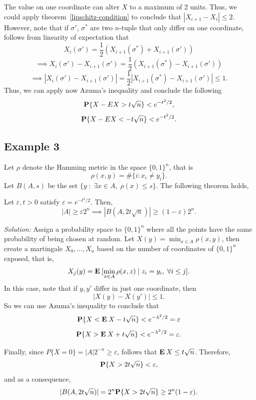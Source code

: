The value on one coordinate can alter $X$ to a maximum of 2 units. Thus, we could apply {theorem}~\ref{lipschitz-condition} to conclude that $|X_{i+1}- X_i| \leq 2$. However, note that if $\sigma'$, $\sigma^*$ are two $n$-tuple that only differ on one coordinate, follows from linearity of expectation that
\[ X_i(\sigma') = \frac{1}{2}(X_{i+1}(\sigma^*)+ X_{i+1}(\sigma')) \]
\[ \implies X_i(\sigma') - X_{i+1}(\sigma')  = \frac{1}{2}(X_{i+1}(\sigma^*)- X_{i+1}(\sigma'))\] 
\[ \implies  |X_i(\sigma') - X_{i+1}(\sigma')|  = \frac{1}{2}|X_{i+1}(\sigma^*)- X_{i+1}(\sigma')| \leq 1.\]
Thus, we can apply now Azuma's inequality and conclude the following
\[ \P\{X - E X > t \sqrt{n}\} < e^{-t^2/2}, \] 
\[ \P\{X - E X < -t \sqrt{n}\} < e^{-t^2/2}. \]
\subsection*{Example 3}
Let $\rho$ denote the Hamming metric in the space ${\{0,1\}}^n$, that is
\[ \rho(x,y) = \#\{i : x_i \neq y_i\}. \]
Let $B(A,s)$ be the set $\{y \;:\; \exists x\in A,\;\rho(x)\leq s\}$. The following theorem holds,

\begin{theorem} Let $\varepsilon, t > 0$ satisfy $\varepsilon = e^{-t^2 / 2}$. Then,
    \[ |A| \geq \varepsilon 2^n \implies |B(A,2t\sqrt{n})| \geq (1-\varepsilon) 2^n. \] 
\end{theorem}

\vspace*{1em}

\textit{Solution:} Assign a probability space to ${\{0,1\}}^n$ where all the points have the same probability of being chosen at random. Let $X(y) = \min_{x\in A} \rho(x,y)$, then create a martingale $X_0, \ldots, X_n$ based on the number of coordinates of ${\{0,1\}}^n$ exposed, that is,
\[ X_j(y) = \E [\min_{x\in A} \rho(x,z) \; | \; z_i = y_i,\; \forall i\leq j]. \]
In this case, note that if $y, y'$ differ in just one coordinate, then
\[ |X(y) - X(y')| \leq 1. \]
So we can use Azuma's inequality to conclude that
\[ \P\{X < \E X - t\sqrt{n}\} < e^{-\lambda^2/2} = \varepsilon \]   
\[ \P\{X > \E X + t\sqrt{n}\} < e^{-\lambda^2/2} = \varepsilon. \]   

Finally, since $P\{X = 0\} = |A|2^{-n} \geq \varepsilon$, follows that $\E X \leq t\sqrt{n}$. Therefore,
\[ \P\{X > 2t\sqrt{n}\} < \varepsilon, \]
and as a consequence,
\[ |B(A,2t\sqrt{n})| = 2^n\P\{X > 2t\sqrt{n}\} \geq 2^n (1-\varepsilon) .  \] 

\vspace*{3em}
